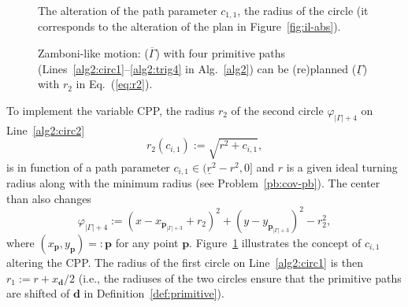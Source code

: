 \documentclass[letterpaper,10pt,journal,twoside]{IEEEtran}
\newcommand{\figpath}{./figures}
\theoremstyle{definition}
\begin{document}
\begin{figure}[t]
  \footnotesize
  \begin{minipage}[l]{0.25\columnwidth}
    \caption{The alteration of the path parameter $c_{1,1}$, the radius of the circle (it corresponds to the alteration of the plan in Figure~\ref{fig:il-abs}).}
    \label{fig:tee1}
  \end{minipage}\hfill
  \begin{minipage}[c]{0.7\columnwidth}
    \centering
    \vspace*{-4.5ex}
    
  \end{minipage}
  \vspace*{-4.5ex}
\end{figure}
\begin{figure}[t]
  \footnotesize
  \begin{minipage}[l]{0.73\columnwidth}
    \centering
    \vspace*{-2ex}
    
  \end{minipage}\hfill
  \begin{minipage}[l]{0.25\columnwidth}
    \caption{Zamboni-like motion: ($\overline{\Gamma}$) with four primitive paths (Lines~\ref{alg2:circ1}--\ref{alg2:trig4} in Alg.~\ref{alg2}) can be (re)planned ($\underline{\Gamma}$) with $r_2$ in Eq.~(\ref{eq:r2}).}
    \label{fig:zambo}
  \end{minipage}
  \vspace*{-4.5ex}
\end{figure}

To implement the variable CPP, the radius $r_2$ of the second circle $\varphi_{|\Gamma|+4}$ on Line~\ref{alg2:circ2}
\begin{equation}\label{eq:r2}
  r_2(c_{i,1}):=\sqrt{r^2+c_{i,1}},
\end{equation}
is in function of a path parameter $c_{i,1}\in(\underline{r}^2-r^2,0]$ and $r$ is a given ideal turning radius along with the minimum radius (see Problem~\ref{pb:cov-pb}). The center than also changes
\begin{equation}\label{eq:second-circ-gene}
  \varphi_{|\Gamma|+4}:=(x-x_{\mathbf{p}_{|\Gamma|+3}}+r_2)^2+(y-y_{\mathbf{p}_{|\Gamma|+3}})^2-r_2^2,
\end{equation}
where $(x_\mathbf{p},y_\mathbf{p})=:\mathbf{p}$ for any point $\mathbf{p}$. Figure~\ref{fig:tee1} illustrates the concept of $c_{i,1}$ altering the CPP. The radius of the first circle on Line~\ref{alg2:circ1} is then $r_1:=r+x_\mathbf{d}/2$ (i.e., the radiuses of the two circles ensure that the primitive paths are shifted of $\mathbf{d}$ in Definition~\ref{def:primitive}).
\end{document}
